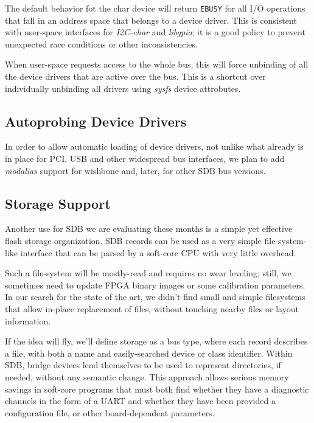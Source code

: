 \documentclass[a4paper, 12pt]{article}
\begin{document}
The default behavior fot the char device will return \texttt{EBUSY} for
all I/O operations that fall in an address space that belongs to a
device driver. This is consistent with user-space interfaces for
\textit{I2C-char} and \textit{libgpio}; it is a good policy to prevent
unexpected race conditions or other inconsistencies.

When user-space requests access to the whole bus, this will force
unbinding of all the device drivers that are active over the bus.
This is a shortcut over individually unbinding all drivers using
\textit{sysfs} device attrobutes.


\subsection{Autoprobing Device Drivers}

In order to allow automatic loading of device drivers, not unlike
what already is in place for PCI, USB and other widespread bus
interfaces, we plan to add \textit{modalias} support for wishbone
and, later, for other SDB bus versions.

\subsection{Storage Support}

Another use for SDB we are evaluating these months is a simple yet
effective flash storage organization.  SDB records can be used as a
very simple file-system-like interface that can be parsed by a
soft-core CPU with very little overhead.

Such a file-system will be mostly-read and requires no wear leveling;
still, we sometimes need to update FPGA binary images or some
calibration parameters.  In our search for the state of the art, we
didn't find small and simple filesystems that allow in-place
replacement of files, without touching nearby files or layout
information.

If the idea will fly, we'll define storage as a bus type, where each
record describes a file, with both a name and easily-searched device
or class identifier.  Within SDB, bridge devices lend themselves to be
used to represent directories, if needed, without any semantic change.
This approach allows serious memory savings in soft-core programs that
must both find whether they have a diagnostic channels in the form of
a UART and whether they have been provided a configuration file, or
other board-dependent parameters.
\end{document}

